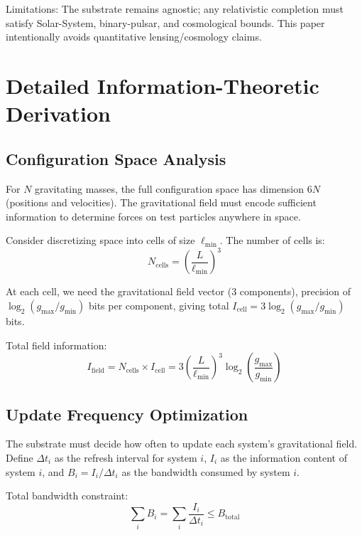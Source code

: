 \documentclass[usenatbib]{mnras}
\begin{document}
Limitations: The substrate remains agnostic; any relativistic completion must satisfy Solar-System, binary-pulsar, and cosmological bounds. This paper intentionally avoids quantitative lensing/cosmology claims.

\appendix

\section{Detailed Information-Theoretic Derivation}

\subsection{Configuration Space Analysis}

For $N$ gravitating masses, the full configuration space has dimension $6N$ (positions and velocities). The gravitational field must encode sufficient information to determine forces on test particles anywhere in space.

Consider discretizing space into cells of size $\ell_{\text{min}}$. The number of cells is:
\begin{equation}
N_{\text{cells}} = \left(\frac{L}{\ell_{\text{min}}}\right)^3
\end{equation}

At each cell, we need the gravitational field vector (3 components), precision of $\log_2(g_{\text{max}}/g_{\text{min}})$ bits per component, giving total $I_{\text{cell}} = 3 \log_2(g_{\text{max}}/g_{\text{min}})$ bits.

Total field information:
\begin{equation}
I_{\text{field}} = N_{\text{cells}} \times I_{\text{cell}} = 3\left(\frac{L}{\ell_{\text{min}}}\right)^3 \log_2\left(\frac{g_{\text{max}}}{g_{\text{min}}}\right)
\end{equation}

\subsection{Update Frequency Optimization}

The substrate must decide how often to update each system's gravitational field. Define $\Delta t_i$ as the refresh interval for system $i$, $I_i$ as the information content of system $i$, and $B_i = I_i/\Delta t_i$ as the bandwidth consumed by system $i$.

Total bandwidth constraint:
\begin{equation}
\sum_i B_i = \sum_i \frac{I_i}{\Delta t_i} \leq B_{\text{total}}
\end{equation}
\end{document}

